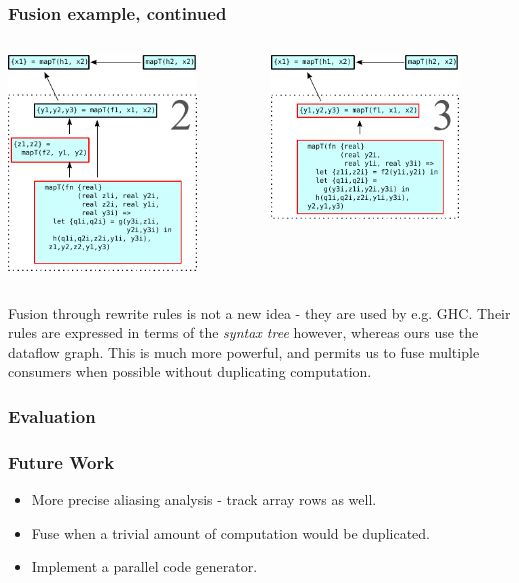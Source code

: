 \documentclass{beamer}
\begin{document}
\begin{frame}[t]
  \frametitle{Fusion example, continued}

  \centering
  \begin{columns}
    \begin{column}[T]{0.48\textwidth}
      \includegraphics[width=5cm]{img/fusion-2.pdf}
    \end{column}\hfill
    \begin{column}[T]{0.48\textwidth}
      \includegraphics[width=5cm]{img/fusion-3.pdf}
    \end{column}
  \end{columns}

  Fusion through rewrite rules is not a new idea - they are used by
  e.g.  GHC.  Their rules are expressed in terms of the \textit{syntax
    tree} however, whereas ours use the dataflow graph.  This is much
  more powerful, and permits us to fuse multiple consumers when
  possible without duplicating computation.

\end{frame}

\begin{frame}
  \frametitle{Evaluation}
\end{frame}

\begin{frame}
  \frametitle{Future Work}

  \begin{itemize}
  \item More precise aliasing analysis - track array rows as well.
  \item Fuse when a trivial amount of computation would be duplicated.
  \item Implement a parallel code generator.
  \end{itemize}
\end{frame}
\end{document}
